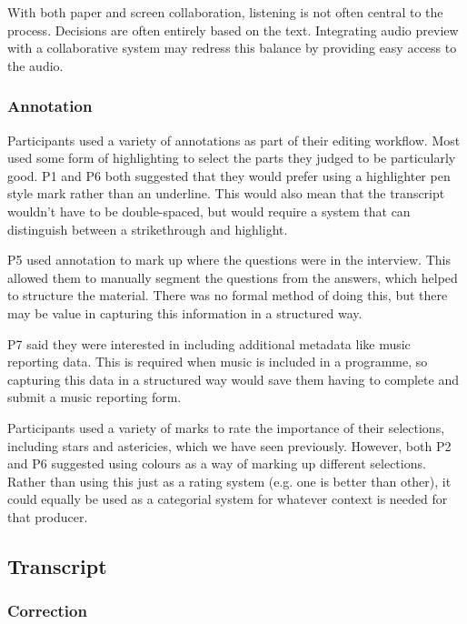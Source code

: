 
With both paper and screen collaboration, listening is not often central to the process. Decisions are often entirely
based on the text. Integrating audio preview with a collaborative system may redress this balance by providing easy
access to the audio.

\subsubsection{Annotation}


Participants used a variety of annotations as part of their editing workflow. Most used some form of highlighting to
select the parts they judged to be particularly good. P1 and P6 both suggested that they would prefer using a
highlighter pen style mark rather than an underline. This would also mean that the transcript wouldn't have to be
double-spaced, but would require a system that can distinguish between a strikethrough and highlight.


P5 used annotation to mark up where the questions were in the interview. This allowed them to manually segment the
questions from the answers, which helped to structure the material. There was no formal method of doing this, but there
may be value in capturing this information in a structured way.

P7 said they were interested in including additional metadata like music reporting data. This is required when music is
included in a programme, so capturing this data in a structured way would save them having to complete and submit a
music reporting form.


Participants used a variety of marks to rate the importance of their selections, including stars and astericies, which
we have seen previously. However, both P2 and P6 suggested using colours as a way of marking up different selections.
Rather than using this just as a rating system (e.g. one is better than other), it could equally be used as a
categorial system for whatever context is needed for that producer.

\subsection{Transcript}

\subsubsection{Correction}

